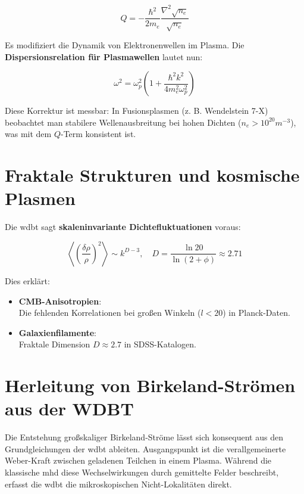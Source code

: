 \begin{equation}
Q = -\frac{\hbar^2}{2m_e} \frac{\nabla^2 \sqrt{n_e}}{\sqrt{n_e}}
\end{equation}

Es modifiziert die Dynamik von Elektronenwellen im Plasma. Die \textbf{Dispersionsrelation für Plasmawellen} lautet nun:

\begin{equation}
\omega^2 = \omega_p^2 \left( 1 + \frac{\hbar^2 k^2}{4 m_e^2 \omega_p^2} \right)
\end{equation}

Diese Korrektur ist messbar: In Fusionsplasmen (z. B. Wendelstein 7-X) beobachtet man stabilere Wellenausbreitung bei hohen Dichten ($n_e > 10^{20} m^{-3}$), was mit dem $Q$-Term
konsistent ist.

\section{Fraktale Strukturen und kosmische Plasmen}
Die \gls{wdbt} sagt \textbf{skaleninvariante Dichtefluktuationen} voraus:

\begin{equation}
\left\langle \left( \frac{\delta \rho}{\rho} \right)^2 \right\rangle \sim k^{D-3}, \quad D = \frac{\ln 20}{\ln(2+\phi)} \approx 2.71
\end{equation}

Dies erklärt:

\begin{itemize}
    \item \textbf{CMB-Anisotropien}:\\Die fehlenden Korrelationen bei großen Winkeln ($l < 20$) in Planck-Daten.
    \item \textbf{Galaxienfilamente}:\\Fraktale Dimension $D \approx 2.7$ in SDSS-Katalogen.
\end{itemize}

\section{Herleitung von Birkeland-Strömen aus der WDBT}
Die Entstehung großskaliger Birkeland-Ströme lässt sich konsequent aus den Grundgleichungen der \gls{wdbt} ableiten. Ausgangspunkt ist die verallgemeinerte Weber-Kraft zwischen
geladenen Teilchen in einem Plasma. Während die klassische \gls{mhd} diese Wechselwirkungen durch gemittelte Felder beschreibt, erfasst die \gls{wdbt} die mikroskopischen
Nicht-Lokalitäten direkt.

